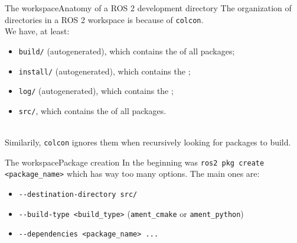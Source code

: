 \begin{frame}{The workspace}{Anatomy of a ROS 2 development directory}
  The organization of directories in a ROS 2 workspace is  because of \texttt{colcon}.\\
  We have, at least:
  \begin{itemize}
    \item \texttt{build/} (autogenerated), which contains the  of all packages;
    \item \texttt{install/} (autogenerated), which contains the ;
    \item \texttt{log/} (autogenerated), which contains the ;
    \item \texttt{src/}, which contains the  of all packages.
  \end{itemize}
  \begin{alertblock}{}
    \centering
    \\
    Similarily, \texttt{colcon} ignores them when recursively looking for packages to build.
  \end{alertblock}
\end{frame}
\begin{frame}{The workspace}{Package creation}
  In the beginning was
  \newline\newline
  \texttt{ros2 pkg create <package\_name>}
  \newline\newline
  which has way too many options. The main ones are:
  \begin{itemize}
    \item \texttt{-{}-destination-directory src/}
    \item \texttt{-{}-build-type <build\_type>} (\texttt{ament\_cmake} or \texttt{ament\_python})
    \item \texttt{-{}-dependencies <package\_name> ...}
  \end{itemize}
\end{frame}
